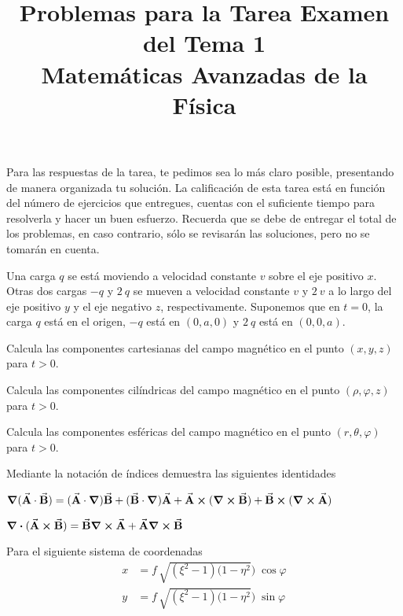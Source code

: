 \documentclass[12pt]{article}
\title{Problemas para la Tarea Examen del Tema 1\\ \large{Matemáticas Avanzadas de la Física}\vspace{-3ex}}
\date{ }
\begin{document}
\vspace{-4cm}
\renewcommand\labelenumii{\theenumi.{\arabic{enumii}}}
\maketitle
\fontsize{14}{14}\selectfont
Para las respuestas de la tarea, te pedimos sea lo más claro posible, presentando de manera organizada tu solución. La calificación de esta tarea está en función del número de ejercicios que entregues, cuentas con el suficiente tiempo para resolverla y hacer un buen esfuerzo. Recuerda que se debe de entregar el total de los problemas, en caso contrario, sólo se  revisarán las soluciones, pero no se tomarán en cuenta.
\begin{milista}
\item Una carga $q$ se está moviendo a velocidad constante $v$ sobre el eje positivo $x$. Otras dos cargas $-q$ y $2 \: q$ se mueven a velocidad constante $v$ y $2 \: v$ a lo largo del eje positivo $y$ y el eje negativo $z$, respectivamente. Suponemos que en $t = 0$, la carga $q$ está en el origen, $-q$ está en $(0, a, 0)$ y $2 \: q$ está en $(0, 0, a)$.
\begin{milista}
\item Calcula las componentes cartesianas del campo magnético en el punto $(x, y, z)$ para $t > 0$.
\item Calcula las componentes cilíndricas del campo magnético en el punto $(\rho, \varphi, z)$ para $t > 0$.
\item Calcula las componentes esféricas del campo magnético en el punto $(r, \theta, \varphi)$ para $t > 0$.
\end{milista}
\item Mediante la notación de índices demuestra las siguientes identidades
\begin{milista}
\item $\grad{(\va{A} \cdot \va{B}}) = (\va{A} \cdot \grad ) \va{B} + (\va{B} \cdot \grad) \va{A} + \va{A} \cp (\curl{\va{B}}) + \va{B} \cp (\curl{\va{A}})$
\item $\div{(\va{A} \cp \va{B})} =  \va{B} \grad \cp \va{A} + \va{A} \grad \cp \va{B}$
\end{milista}
\item Para el siguiente sistema de coordenadas
\begin{align*}
x &= f \, \sqrt{(\xi^{2} -1) (1 - \eta^{2}}) \; \cos \varphi \\
y &= f \, \sqrt{(\xi^{2} -1) (1 - \eta^{2}}) \; \sin \varphi \\

\end{align*}
\end{milista}
\end{document}
